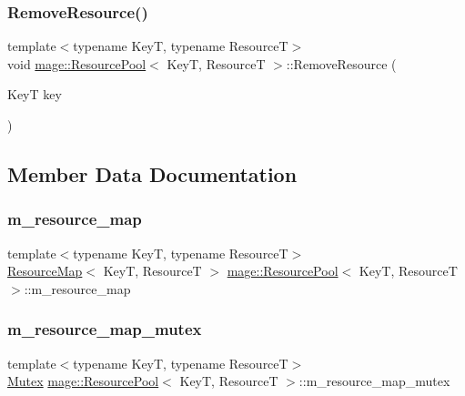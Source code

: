 \subsubsection{\texorpdfstring{Remove\+Resource()}{RemoveResource()}}
{\footnotesize\ttfamily template$<$typename KeyT, typename ResourceT$>$ \\
void \hyperlink{classmage_1_1_resource_pool}{mage\+::\+Resource\+Pool}$<$ KeyT, ResourceT $>$\+::Remove\+Resource (\begin{DoxyParamCaption}\item[{KeyT}]{key }\end{DoxyParamCaption})}



\subsection{Member Data Documentation}
\hypertarget{classmage_1_1_resource_pool_aecc46ecca2a54ef2816137276b1d73cd}{}\label{classmage_1_1_resource_pool_aecc46ecca2a54ef2816137276b1d73cd} 
\subsubsection{\texorpdfstring{m\+\_\+resource\+\_\+map}{m\_resource\_map}}
{\footnotesize\ttfamily template$<$typename KeyT, typename ResourceT$>$ \\
\hyperlink{namespacemage_a0b0a087ad59dd4aa0b4b538d8caec216}{Resource\+Map}$<$ KeyT, ResourceT $>$ \hyperlink{classmage_1_1_resource_pool}{mage\+::\+Resource\+Pool}$<$ KeyT, ResourceT $>$\+::m\+\_\+resource\+\_\+map\hspace{0.3cm}{\ttfamily [private]}}

\hypertarget{classmage_1_1_resource_pool_a5857b70ac755db750dcaff5277201f9f}{}\label{classmage_1_1_resource_pool_a5857b70ac755db750dcaff5277201f9f} 
\subsubsection{\texorpdfstring{m\+\_\+resource\+\_\+map\+\_\+mutex}{m\_resource\_map\_mutex}}
{\footnotesize\ttfamily template$<$typename KeyT, typename ResourceT$>$ \\
\hyperlink{structmage_1_1_mutex}{Mutex} \hyperlink{classmage_1_1_resource_pool}{mage\+::\+Resource\+Pool}$<$ KeyT, ResourceT $>$\+::m\+\_\+resource\+\_\+map\+\_\+mutex\hspace{0.3cm}{\ttfamily [private]}}

